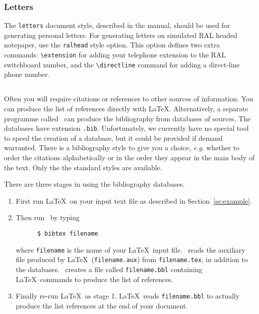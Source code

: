 \subsubsection{Letters} \label{se:letters}

The \mbox{\tt letters} document style, described in the manual, should be used
for generating personal letters.  For generating letters on simulated RAL headed
notepaper, use the \mbox{\tt ralhead} style option. This option defines two
extra commands: \hbox{\verb|\extension|} for adding your telephone extension to
the RAL switchboard number, and the \hbox{\verb|\directline|} command for
adding a direct-line phone number. 


\subsection{\BibTeX}
\label{se:bibtex}
Often you will require citations or references to other sources of
information. You can produce the list of references directly with
\LaTeX.  Alternatively,
a separate programme called \BibTeX\ can produce the bibliography from
databases of sources. 
The databases have extension \mbox{\tt .bib}. Unfortunately, we
currently have no special tool to speed the creation of a database, but it
could be provided if demand warranted.
There is a bibliography style to give you a choice, {\em e.g.} whether
to order the citations alphabetically or in the order they appear in the 
main body of the text. Only the the standard styles are available.

There are three stages in using the bibliography databases.
\begin{enumerate}
\item
First run \LaTeX\ on your input text file as described in
Section~\ref{se:example}.
\item
Then run \BibTeX\ by typing
\begin{verbatim}
      $ bibtex filename
\end{verbatim}
where \mbox{\tt filename} is the name of your \LaTeX\ input
file.
\BibTeX\ reads the auxiliary file produced by \LaTeX\ 
(\mbox{\tt filename.aux}) from \mbox{\tt filename.tex}, in addition to the
databases.
\BibTeX\ creates a file called \mbox{\tt filename.bbl} containing \LaTeX\
commands to produce the list of references.
\item
Finally re-run \LaTeX\ as stage 1. \LaTeX\ reads \mbox{\tt filename.bbl}
to actually produce the list references at the end of your document.
\end{enumerate}

